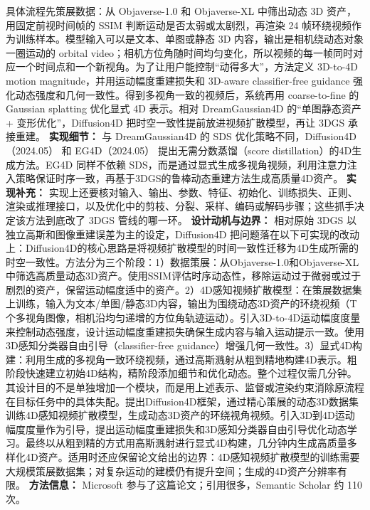 具体流程先策展数据：从 Objaverse-1.0 和 Objaverse-XL 中筛出动态 3D 资产，用固定前视时间帧的 SSIM 判断运动是否太弱或太剧烈，再渲染 24 帧环绕视频作为训练样本。模型输入可以是文本、单图或静态 3D 内容，输出是相机绕动态对象一圈运动的 orbital video；相机方位角随时间均匀变化，所以视频的每一帧同时对应一个时间点和一个新视角。为了让用户能控制“动得多大”，方法定义 3D-to-4D motion magnitude，并用运动幅度重建损失和 3D-aware classifier-free guidance 强化动态强度和几何一致性。得到多视角一致的视频后，系统再用 coarse-to-fine 的 Gaussian splatting 优化显式 4D 表示。相对 DreamGaussian4D 的“单图静态资产 + 变形优化”，Diffusion4D 把时空一致性提前放进视频扩散模型，再让 3DGS 承接重建。
\textbf{实现细节：} 与 DreamGaussian4D 的 SDS 优化策略不同，Diffusion4D（2024.05） 和 EG4D（2024.05） 提出无需分数蒸馏（score distillation）的4D生成方法。EG4D 同样不依赖 SDS，而是通过显式生成多视角视频，利用注意力注入策略保证时序一致，再基于3DGS的鲁棒动态重建方法生成高质量4D资产。
\textbf{实现补充：} 实现上还要核对输入、输出、参数、特征、初始化、训练损失、正则、渲染或推理接口，以及优化中的剪枝、分裂、采样、编码或解码步骤；这些抓手决定该方法到底改了 3DGS 管线的哪一环。
\textbf{设计动机与边界：} 相对原始 3DGS 以独立高斯和图像重建误差为主的设定，Diffusion4D 把问题落在以下可实现的改动上：Diffusion4D的核心思路是将视频扩散模型的时间一致性迁移为4D生成所需的时空一致性。方法分为三个阶段：1）数据策展：从Objaverse-1.0和Objaverse-XL中筛选高质量动态3D资产。使用SSIM评估时序动态性，移除运动过于微弱或过于剧烈的资产，保留运动幅度适中的资产。2）4D感知视频扩散模型：在策展数据集上训练，输入为文本/单图/静态3D内容，输出为围绕动态3D资产的环绕视频（T个多视角图像，相机沿均匀递增的方位角轨迹运动）。引入3D-to-4D运动幅度度量来控制动态强度，设计运动幅度重建损失确保生成内容与输入运动提示一致。使用3D感知分类器自由引导（classifier-free guidance）增强几何一致性。3）显式4D构建：利用生成的多视角一致环绕视频，通过高斯溅射从粗到精地构建4D表示。粗阶段快速建立初始4D结构，精阶段添加细节和优化动态。整个过程仅需几分钟。其设计目的不是单独增加一个模块，而是用上述表示、监督或渲染约束消除原流程在目标任务中的具体失配。提出Diffusion4D框架，通过精心策展的动态3D数据集训练4D感知视频扩散模型，生成动态3D资产的环绕视角视频。引入3D到4D运动幅度度量作为引导，提出运动幅度重建损失和3D感知分类器自由引导优化动态学习。最终以从粗到精的方式用高斯溅射进行显式4D构建，几分钟内生成高质量多样化4D资产。适用时还应保留论文给出的边界：4D感知视频扩散模型的训练需要大规模策展数据集；对复杂运动的建模仍有提升空间；生成的4D资产分辨率有限。
\textbf{方法信息：} Microsoft 参与了这篇论文；引用很多，Semantic Scholar 约 110 次。



